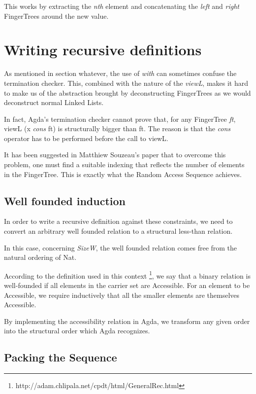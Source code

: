 \documentclass[12pt,twoside,notitlepage]{report}
\begin{document}
This works by extracting the \textit{nth} element and concatenating the \textit{left} and \textit{right} FingerTrees around the new value.

\section{Writing recursive definitions}

As mentioned in section whatever, the use of \textit{with} can sometimes confuse the termination checker. This, combined with the nature of the \textit{viewL}, makes it hard to make us of the abstraction brought by deconstructing FingerTrees as we would deconstruct normal Linked Lists.

In fact, Agda's termination checker cannot prove that, for any FingerTree \textit{ft}, viewL (x \textit{cons} ft) is structurally bigger than ft. The reason is that the \textit{cons} operator has to be performed before the call to viewL.
 
It has been suggested in Matthiew Souzeau's paper \cite{coq} that to overcome this problem, one must find a suitable indexing that reflects the number of elements in the FingerTree. This is exactly what the Random Access Sequence achieves.

\subsection{Well founded induction}

In order to write a recursive definition against these constraints, we need to convert an arbitrary well founded relation to a structural less-than relation. 

In this case, concerning \textit{SizeW}, the well founded relation comes free from the natural ordering of Nat. 

According to the definition used in this context \footnote{http://adam.chlipala.net/cpdt/html/GeneralRec.html}, we say that a binary relation is well-founded if all elements in the carrier set are Accessible. For an element to be Accessible, we require inductively that all the smaller elements are themselves Accessible.

By implementing the accessibility relation in Agda, we transform any given order into the structural order which Agda recognizes.

\subsection{Packing the Sequence}
\end{document}
